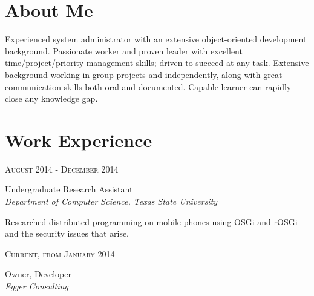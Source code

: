 \documentclass[10pt]{article} %
\begin{document}
\begin{minipage}[t]{0.5\textwidth} %
\vspace{0pt} %
	
\section{About Me}
Experienced system administrator with an extensive object-oriented development background. Passionate worker and proven leader with excellent time/project/priority management skills; driven to succeed at any task. Extensive background working in group projects and independently, along with great communication skills both oral and documented. Capable learner can rapidly close any  knowledge gap.


\section{Work Experience} 


{\raggedleft\textsc{August 2014 - December 2014}\par}

{\raggedright\large Undergraduate Research Assistant\\
\textit{Department of Computer Science, Texas State University}\\[5pt]}

\normalsize{Researched distributed programming on mobile phones using OSGi and rOSGi and the security issues that arise.}\\


{\raggedleft\textsc{Current, from January 2014}\par}

{\raggedright\large Owner, Developer\\
\textit{Egger Consulting}\\[5pt]}


\end{minipage}
\end{document}
